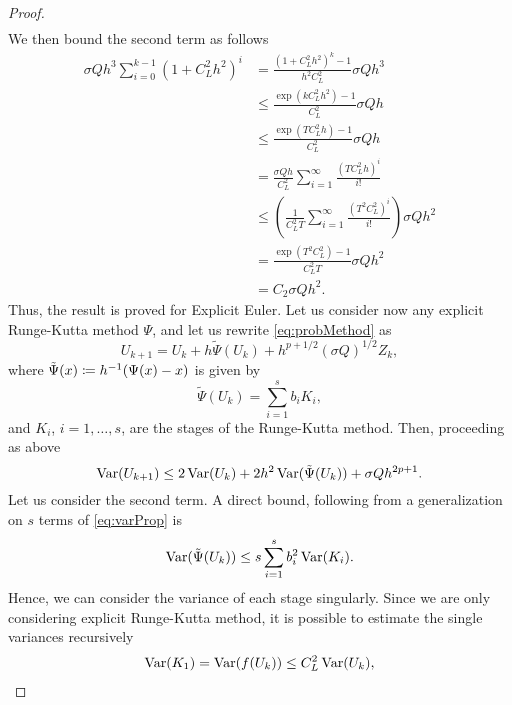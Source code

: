 \begin{proof}
\begin{equation}
\begin{aligned}
\end{aligned}
\end{equation}
We then bound the second term as follows
\begin{equation}\label{eq:boundOfSum}
\begin{aligned}
	\sigma Q h^3 \sum_{i = 0}^{k - 1}(1 + C_L^2h^2)^i &=  \frac{(1 + C_L^2h^2)^k - 1}{h^2C_L^2}\sigma Qh^3 \\
	&\leq  \frac{\exp(kC_L^2h^2) - 1}{C_L^2}\sigma Qh \\ 
	&\leq  \frac{\exp(TC_L^2h) - 1}{C_L^2}\sigma Qh \\
	&= \frac{\sigma Qh}{C_L^2} \sum_{i = 1}^{\infty} \frac{(TC_L^2h)^i}{i!} \\
	&\leq \left(\frac{1}{C_L^2T} \sum_{i = 1}^{\infty} \frac{(T^2C_L^2)^i}{i!}\right)\sigma Q h^2 \\
	&= \frac{\exp(T^2C_L^2) - 1}{C_L^2T} \sigma Q h^2 \\
	&= C_2 \sigma Q h^2.
\end{aligned}
\end{equation}
Thus, the result is proved for Explicit Euler. Let us consider now any explicit Runge-Kutta method $\Psi$, and let us rewrite \eqref{eq:probMethod} as
\begin{equation}
	U_{k+1} = U_k + h\tilde \Psi (U_k) + h^{p + 1/2} (\sigma Q)^{1/2} Z_k,
\end{equation}
where $\tilde\Psi(x) \coloneqq h^{-1}(\Psi(x) - x)$ is given by
\begin{equation}
	\tilde\Psi(U_k) = \sum_{i = 1}^{s} b_i K_i,
\end{equation} 
and $K_i$, $i = 1, \ldots, s$, are the stages of the Runge-Kutta method. Then, proceeding as above
\begin{equation}
	\operatorname{Var}(U_{k+1}) \leq 2\operatorname{Var}(U_k) + 2h^2 \operatorname{Var}(\tilde \Psi (U_k)) + \sigma Q h^{2p + 1}.
\end{equation}
Let us consider the second term. A direct bound, following from a generalization on $s$ terms of \eqref{eq:varProp} is
\begin{equation}\label{eq:temp}
	\operatorname{Var}(\tilde \Psi (U_k)) \leq s\sum_{i = 1}^{s} b_i^2 \operatorname{Var}(K_i).
\end{equation}
Hence, we can consider the variance of each stage singularly. Since we are only considering explicit Runge-Kutta method, it is possible to estimate the single variances recursively
\begin{equation}
	\begin{aligned}
		\Var(K_1) &= \Var(f(U_k)) \leq C_L^2 \Var(U_k), \\

\end{aligned}
\end{equation}
\end{proof}

